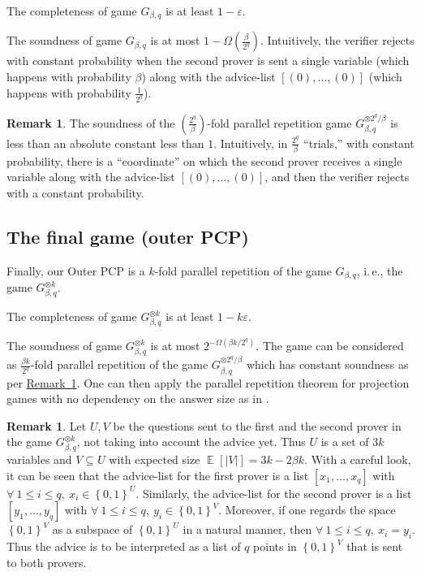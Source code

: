 \documentclass[11pt]{article}
\numberwithin{equation}{section}
\theoremstyle{definition}
\newtheorem{remark}[theorem]{Remark}
\theoremstyle{plain}
\newcommand{\ie}{i.\,e.}
\newcommand{\expref}[2]{\hyperref[#2]{#1~\ref{#2}}}
\newcommand\set[1]{{\left\{ #1 \right\}}}
\newcommand\power[1]{\set{0,1}^{#1}}
\newcommand\Expect[2]{{\mathop{\mathbb{E}}_{#1}\left[ {#2} \right]}}
\newcommand\eps{\varepsilon}
\renewcommand\leq{\leqslant}
\begin{document}
\smallskip
{} The completeness of game $G_{\beta, q}$ is at least $1-\eps$.

\smallskip
{} The soundness of game $G_{\beta, q}$ is at most $1- \Omega\left(\frac{\beta}{2^q}\right)$. Intuitively,
the verifier rejects with constant probability when the second prover is sent a single variable (which happens with probability $\beta$)
along with the advice-list $[(0), \ldots, (0)]$ (which happens with probability $\frac{1}{2^q}$).

\begin{remark}\label{remark:constant_rej}
The soundness of the $\left(\frac{2^q}{\beta} \right)$-fold parallel
repetition game $G_{\beta, q}^{\otimes 2^q/\beta}$ is
%
less than %
an absolute constant less than $1$. Intuitively, in $\frac{2^q}{\beta}$ ``trials,''
with constant probability, there is a  ``coordinate'' on which
the second prover receives a single variable
along with the advice-list $[(0), \ldots, (0)]$,
and then the verifier rejects with a constant probability.
\end{remark}

\subsection{The final game (outer PCP) }\label{final_game}\label{sec:final-outer-pcp}

Finally, our Outer PCP is a $k$-fold parallel repetition of the game $G_{\beta, q}$, \ie, the game $G_{\beta, q}^{\otimes k}$.

\smallskip
{} The completeness of game $G_{\beta, q}^{\otimes k}$ is at least $1-k\eps$.

\smallskip
{} The soundness of game $G_{\beta, q}^{\otimes k} $ is at most $2^{-\Omega(\beta k/2^q)}$. The game can be considered
as $\frac{\beta k}{2^q}$-fold parallel repetition of the game $G_{\beta, q}^{\otimes 2^q/\beta}$ which has constant soundness as per
\expref{Remark}{remark:constant_rej}. One can then apply the parallel repetition theorem for
projection games with no dependency on the answer size as in \cite{Rao,DS14}.

\begin{remark} Let $U, V$ be the questions sent to the first and the second prover in the game $G_{\beta, q}^{\otimes k}$, not taking into
account the advice yet. Thus $U$ is a set of $3k$ variables and $V \subseteq U$ with expected size $\Expect{}{|V|} = 3k - 2\beta k$.
With a careful look, it can be seen that the advice-list for the first prover is a list $[x_1,\ldots, x_q]$ with $\forall ~1\leq i \leq q,
~ x_i \in \power{U}$. Similarly, the advice-list for the second prover is a list $[y_1,\ldots, y_q]$ with $\forall ~1\leq i \leq q,
~ y_i \in \power{V}$. Moreover, if one regards the space $\power{V}$ as a subspace of $\power{U}$ in a natural manner, then
$\forall ~1\leq i \leq q, ~x_i = y_i$. Thus the advice is to be interpreted as a list of $q$ points in $\power{V}$ that is sent to both provers.
\end{remark}
\end{document}
